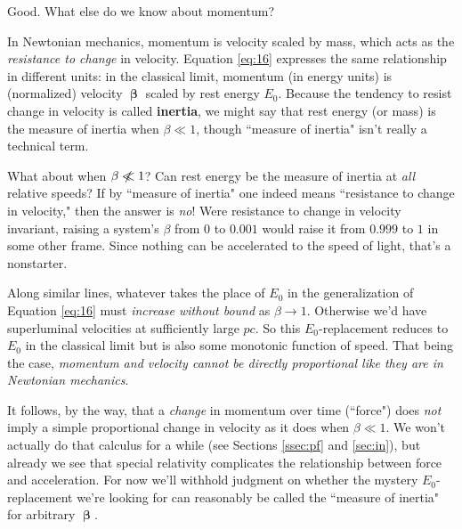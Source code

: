 \documentclass[12pt]{article}
\newcommand{\vvbeta}{\bm{\upbeta}}
\begin{document}
Good. What else do we know about momentum?

In Newtonian mechanics, momentum is velocity scaled by mass, which acts as the \emph{resistance to change} in velocity. Equation \ref{eq:16} expresses the same relationship in different units: in the classical limit, momentum (in energy units) is (normalized) velocity $\vvbeta$ scaled by rest energy $E_0$. Because the tendency to resist change in velocity is called \textbf{inertia}, we might say that rest energy (or mass) is the measure of inertia when $\beta \ll 1$, though ``measure of inertia" isn't really a technical term.

What about when $\beta \centernot{\ll} 1$? Can rest energy be the measure of inertia at \emph{all} relative speeds? If by ``measure of inertia" one indeed means ``resistance to change in velocity," then the answer is \emph{no}! Were resistance to change in velocity invariant, raising a system's $\beta$ from $0$ to $0.001$ would raise it from $0.999$ to $1$ in some other frame. Since nothing can be accelerated to the speed of light, that's a nonstarter.

Along similar lines, whatever takes the place of $E_0$ in the generalization of Equation \ref{eq:16} must \emph{increase without bound} as $\beta \rightarrow 1$. Otherwise we'd have superluminal velocities at sufficiently large $p c$. So this $E_0$-replacement reduces to $E_0$ in the classical limit but is also some monotonic function of speed. That being the case, \emph{momentum and velocity cannot be directly proportional like they are in Newtonian mechanics}.

It follows, by the way, that a \emph{change} in momentum over time (``force") does \emph{not} imply a simple proportional change in velocity as it does when $\beta \ll 1$. We won't actually do that calculus for a while (see Sections \ref{ssec:pf} and \ref{sec:in}), but already we see that special relativity complicates the relationship between force and acceleration. For now we'll withhold judgment on whether the mystery $E_0$-replacement we're looking for can reasonably be called the ``measure of inertia" for arbitrary $\vvbeta$.
\end{document}
